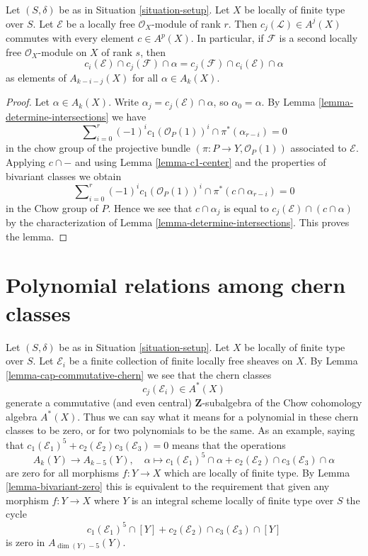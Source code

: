 \begin{lemma}
\label{lemma-cap-commutative-chern}
Let $(S, \delta)$ be as in Situation \ref{situation-setup}.
Let $X$ be locally of finite type over $S$.
Let $\mathcal{E}$ be a locally free $\mathcal{O}_X$-module of rank $r$.
Then $c_j(\mathcal{L}) \in A^j(X)$ commutes with every
element $c \in A^p(X)$. In particular, if $\mathcal{F}$ is a
second locally free $\mathcal{O}_X$-module on $X$ of rank $s$, then
$$
c_i(\mathcal{E}) \cap c_j(\mathcal{F}) \cap \alpha
=
c_j(\mathcal{F}) \cap c_i(\mathcal{E}) \cap \alpha
$$
as elements of $A_{k - i - j}(X)$ for all $\alpha \in A_k(X)$.
\end{lemma}

\begin{proof}
Let $\alpha \in A_k(X)$. Write $\alpha_j = c_j(\mathcal{E}) \cap \alpha$, so
$\alpha_0 = \alpha$. By Lemma \ref{lemma-determine-intersections} we have
$$
\sum\nolimits_{i = 0}^r
(-1)^i c_1(\mathcal{O}_P(1))^i \cap
\pi^*(\alpha_{r - i}) = 0
$$
in the chow group of the projective bundle
$(\pi : P \to Y, \mathcal{O}_P(1))$
associated to $\mathcal{E}$. Applying $c \cap -$ and using
Lemma \ref{lemma-c1-center} and the properties of bivariant classes we obtain
$$
\sum\nolimits_{i = 0}^r
(-1)^i c_1(\mathcal{O}_P(1))^i \cap
\pi^*(c \cap \alpha_{r - i}) = 0
$$
in the Chow group of $P$. Hence we see that $c \cap \alpha_j$ is
equal to $c_j(\mathcal{E}) \cap (c \cap \alpha)$ by the characterization
of Lemma \ref{lemma-determine-intersections}.
This proves the lemma.
\end{proof}









\section{Polynomial relations among chern classes}
\label{section-relations-chern-classes}

\noindent
Let $(S, \delta)$ be as in Situation \ref{situation-setup}. Let $X$ be locally
of finite type over $S$. Let $\mathcal{E}_i$ be a finite collection of finite
locally free sheaves on $X$. By Lemma \ref{lemma-cap-commutative-chern}
we see that the chern classes
$$
c_j(\mathcal{E}_i) \in A^*(X)
$$
generate a commutative (and even central) $\mathbf{Z}$-subalgebra of the
Chow cohomology algebra $A^*(X)$.
Thus we can say what it means for a polynomial in these chern classes
to be zero, or for two polynomials to be the same. As an example, saying that
$c_1(\mathcal{E}_1)^5 + c_2(\mathcal{E}_2)c_3(\mathcal{E}_3) = 0$
means that the operations
$$
A_k(Y) \longrightarrow A_{k - 5}(Y), \quad
\alpha \longmapsto
c_1(\mathcal{E}_1)^5 \cap \alpha +
c_2(\mathcal{E}_2) \cap c_3(\mathcal{E}_3) \cap \alpha
$$
are zero for all morphisms $f : Y \to X$ which are locally of finite type.
By Lemma \ref{lemma-bivariant-zero}
this is equivalent to the requirement that given any morphism
$f : Y \to X$  where $Y$ is an integral scheme
locally of finite type over $S$ the cycle
$$
c_1(\mathcal{E}_1)^5 \cap [Y] +
c_2(\mathcal{E}_2) \cap c_3(\mathcal{E}_3) \cap [Y]
$$
is zero in $A_{\dim(Y) - 5}(Y)$.

